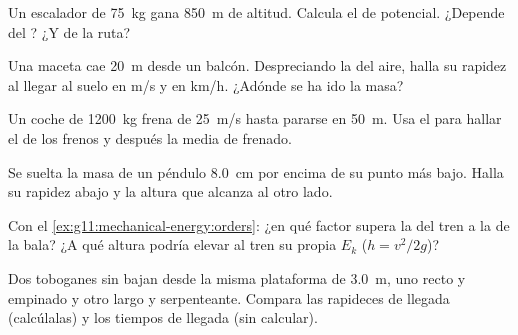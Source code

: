 \begin{exercise}[$\star$]\label{exo:g11:mechanical-energy:2}
Un escalador de \qty{75}{kg} gana \qty{850}{m} de altitud. Calcula el
 de  potencial. ¿Depende del ? ¿Y de la
ruta?
\end{exercise}

\begin{exercise}[$\star$]\label{exo:g11:mechanical-energy:3}
Una maceta cae \qty{20}{m} desde un balcón. Despreciando la 
del aire, halla su rapidez al llegar al suelo en \unit{m/s} y en
\unit{km/h}. ¿Adónde se ha ido la masa?
\end{exercise}

\begin{exercise}[$\star$]\label{exo:g11:mechanical-energy:4}
Un coche de \qty{1200}{kg} frena de \qty{25}{m/s} hasta pararse en
\qty{50}{m}. Usa el  para hallar el
 de los frenos y después la  media de frenado.
\end{exercise}

\begin{exercise}[$\star$]\label{exo:g11:mechanical-energy:5}
Se suelta la masa de un péndulo \qty{8.0}{cm} por encima de su punto más
bajo. Halla su rapidez abajo y la altura que alcanza al otro lado.
\end{exercise}

\begin{exercise}[$\star\star$]\label{exo:g11:mechanical-energy:6}
Con el \cref{ex:g11:mechanical-energy:orders}: ¿en qué factor supera la
 del tren a la de la bala? ¿A qué altura podría elevar
al tren su propia $E_k$ ($h = v^2/2g$)?
\end{exercise}

\begin{exercise}[$\star\star$]\label{exo:g11:mechanical-energy:7}
Dos toboganes sin  bajan desde la misma plataforma de
\qty{3.0}{m}, uno recto y empinado y otro largo y serpenteante. Compara
las rapideces de llegada (calcúlalas) y los tiempos de llegada (sin
calcular).
\end{exercise}

